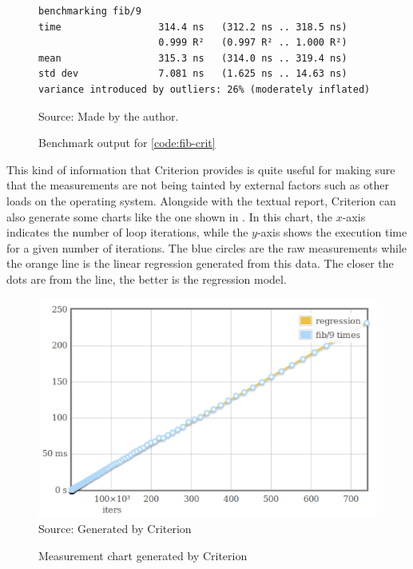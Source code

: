 \begin{figure}[htp]
  \centering
  \caption{Benchmark output for \autoref{code:fib-crit}}
  \begin{Verbatim}[fontsize=\small]
benchmarking fib/9
time                 314.4 ns   (312.2 ns .. 318.5 ns)
                     0.999 R²   (0.997 R² .. 1.000 R²)
mean                 315.3 ns   (314.0 ns .. 319.4 ns)
std dev              7.081 ns   (1.625 ns .. 14.63 ns)
variance introduced by outliers: 26% (moderately inflated)
  \end{Verbatim}
  \footnotesize{Source: Made by the author.}
  \label{fig:fib-output}
\end{figure}

This kind of information that Criterion provides is quite useful for making sure that the measurements are not being tainted by external factors such as other loads on the operating system. Alongside with the textual report, Criterion can also generate some charts like the one shown in . In this chart, the $x$-axis indicates the number of loop iterations, while the $y$-axis shows the execution time for a given number of iterations. The blue circles are the raw measurements while the orange line is the linear regression generated from this data. The closer the dots are from the line, the better is the regression model.

\begin{figure}[htp]
  \centering
  \caption{Measurement chart generated by Criterion}
  \includegraphics[width=.6\columnwidth]{images/criterion-chart} \\
  \footnotesize{Source: Generated by Criterion}
  \label{fig:crit-chart}
\end{figure}


